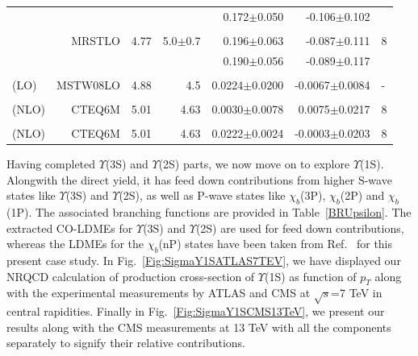 \begin{table}
\begin{tabular*}{\textwidth}{@{\extracolsep{\fill}}lrrrrrl@{}}
    & & & & 0.172$\pm$0.050 & -0.106$\pm$0.102 & \\
    & & & & & & \\
    & MRSTLO & 4.77 & 5.0$\pm$0.7 & 0.196$\pm$0.063 & -0.087$\pm$0.111 & 8 \\
    & & & & 0.190$\pm$0.056 & -0.089$\pm$0.117 & \\
    & & & & & & \\
    \cite{Sharma:2012dy} (LO) & MSTW08LO & 4.88 & 4.5 & 0.0224$\pm$0.0200 & -0.0067$\pm$0.0084 & -  \\
    & & & & & & \\
    \cite{Gong:2013qka} (NLO) & CTEQ6M & 5.01 & 4.63 & 0.0030$\pm$0.0078 & 0.0075$\pm$0.0217 & 8 \\
    & & & & & & \\
    \cite{Feng:2015wka} (NLO) & CTEQ6M & 5.01 & 4.63 & 0.0222$\pm$0.0024 & -0.0003$\pm$0.0203 & 8 \\
    \hline
    \hline
  \end{tabular*}
  \label{LDMEsY2S}
\end{table}
\normalsize
Having completed $\Upsilon$(3S) and $\Upsilon$(2S) parts, we now move on to explore $\Upsilon$(1S). 
Alongwith the direct yield, it has feed down contributions from higher
S-wave states like $\Upsilon$(3S) and $\Upsilon$(2S), as well as P-wave states like $\chi_b$(3P), $\chi_b$(2P)
and $\chi_b$(1P). The associated branching functions are provided in Table~\ref{BRUpsilon}.
The extracted CO-LDMEs for $\Upsilon$(3S) and $\Upsilon$(2S) are used for feed down contributions,
whereas the LDMEs for the $\chi_b$(nP) states have been taken from Ref.~\cite{Sharma:2012dy,Feng:2015wka}
for this present case study.
In Fig.~\ref{Fig:SigmaY1SATLAS7TEV}, we have displayed our NRQCD calculation of production cross-section 
of $\Upsilon$(1S) as function of $p_T$ along with the experimental measurements by ATLAS and
CMS at $\sqrt{s}$=7 TeV in central rapidities.
Finally in Fig.~\ref{Fig:SigmaY1SCMS13TeV}, we present our results along with
the CMS measurements at 13 TeV with all the components separately to signify their relative
contributions. 
